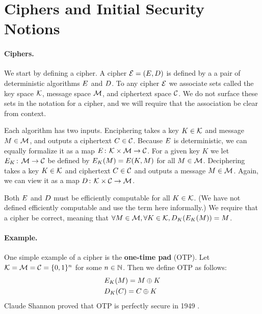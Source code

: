\section{Ciphers and Initial Security Notions}
\label{sec:se}

\paragraph{Ciphers.}
We start by defining a cipher. A cipher ${\cal E} = (E,D)$ is
defined by a a pair of deterministic algorithms $E$ and $D$.  To
any cipher ${\cal E}$ we associate sets called the key space ${\cal K}$, message
space ${\cal M}$, and ciphertext space ${\cal C}$. We do not surface these sets in the
notation for a cipher, and we will require that the association be clear
from context.

Each algorithm has two inputs. Enciphering takes a key $K \in {\cal K}$ and
message $M \in {\cal M}$, and outputs a ciphertext $C \in {\cal C}$. Because
$E$ is deterministic, we can equally formalize it as a map 
$E{{\kern .05em}\colon{\kern .05em}}{\cal K}\times{\cal M}\rightarrow{\cal C}$. For a given key
$K$ we let $E_K{{\kern .05em}\colon{\kern .05em}}{\cal M}\rightarrow{\cal C}$ be defined by
$E_K(M) = E(K,M)$ for all $M \in {\cal M}$.  Deciphering takes a key $K\in {\cal K}$ and ciphertext
$C \in {\cal C}$ and outputs a message $M \in {\cal M}$. Again, we can view
it as a map $D{{\kern .05em}\colon{\kern .05em}}{\cal K}\times{\cal C}\rightarrow{\cal M}$. 

Both $E$ and $D$ must be efficiently computable for all $K \in
{\cal K}$.  (We have not defined efficiently computable and use the term here
informally.) We require that a cipher be correct, meaning that
$\forall M \in {\cal M}, \forall K \in {\cal K}, D_K(E_K(M)) = M$.

\paragraph{Example.} One simple example of a cipher is the \textbf{one-time pad} (OTP). Let ${\cal K} = {\cal M}={\cal C}=\{0,1\}^n$ for some $n \in {{\mathbb N}}$. Then we define OTP as follows:
\begin{align*}
&E_K(M) = M \oplus K \\
&D_K(C) = C \oplus K
\end{align*}
Claude Shannon proved that OTP is perfectly secure in 1949 \cite{shannon1949communication}.

